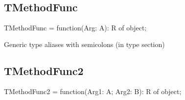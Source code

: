 \documentclass{report}
\begin{document}
\subsection*{TMethodFunc}
\begin{list}{}{
\setlength{\itemindent}{0cm}
\setlength{\listparindent}{0cm}
\setlength{\leftmargin}{\evensidemargin}
\addtolength{\leftmargin}{\tmplength}
\settowidth{\labelsep}{X}
\addtolength{\leftmargin}{\labelsep}
\setlength{\labelwidth}{\tmplength}
}
\begin{flushleft}
\item[\textbf{Declaration}\hfill]
\begin{ttfamily}
TMethodFunc = function(Arg: A): R of object;\end{ttfamily}


\end{flushleft}
\par
\item[\textbf{Description}]
Generic type aliases with semicolons (in type section)

\end{list}
\subsection*{TMethodFunc2}
\begin{list}{}{
\setlength{\itemindent}{0cm}
\setlength{\listparindent}{0cm}
\setlength{\leftmargin}{\evensidemargin}
\addtolength{\leftmargin}{\tmplength}
\settowidth{\labelsep}{X}
\addtolength{\leftmargin}{\labelsep}
\setlength{\labelwidth}{\tmplength}
}
\begin{flushleft}
\item[\textbf{Declaration}\hfill]
\begin{ttfamily}
TMethodFunc2 = function(Arg1: A; Arg2: B): R of object;\end{ttfamily}


\end{flushleft}
\end{list}
\end{document}

